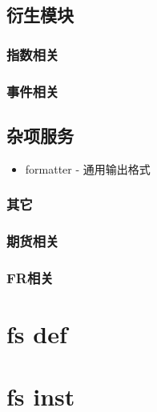 \documentclass[11pt]{article}
\begin{document}
\subsection{衍生模块}
\label{sec:orgheadline148}

\subsubsection{指数相关}
\label{sec:orgheadline146}

\subsubsection{事件相关}
\label{sec:orgheadline147}

\subsection{杂项服务}
\label{sec:orgheadline152}
\begin{itemize}
\item formatter - 通用输出格式
\end{itemize}
\subsubsection{其它}
\label{sec:orgheadline149}
\subsubsection{期货相关}
\label{sec:orgheadline150}
\subsubsection{FR相关}
\label{sec:orgheadline151}
\section{fs def}
\label{sec:orgheadline154}

\section{fs inst}
\label{sec:orgheadline155}
\end{document}
